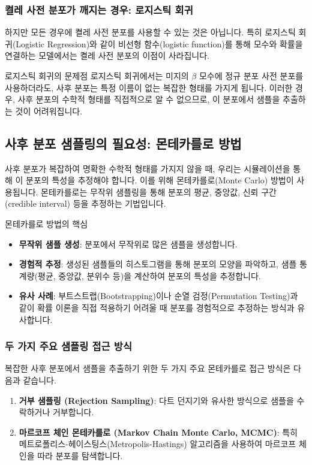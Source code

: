 \documentclass[11pt,a4paper]{article}
\begin{document}
\subsubsection*{켤레 사전 분포가 깨지는 경우: 로지스틱 회귀}
하지만 모든 경우에 켤레 사전 분포를 사용할 수 있는 것은 아닙니다. 특히 로지스틱 회귀(Logistic Regression)와 같이 비선형 함수(logistic function)를 통해 모수와 확률을 연결하는 모델에서는 켤레 사전 분포의 이점이 사라집니다.

\begin{warningbox}{로지스틱 회귀의 문제점}
로지스틱 회귀에서는 미지의 $\beta$ 모수에 정규 분포 사전 분포를 사용하더라도, 사후 분포는 특정 이름이 없는 복잡한 형태를 가지게 됩니다.
이러한 경우, 사후 분포의 수학적 형태를 직접적으로 알 수 없으므로, 이 분포에서 샘플을 추출하는 것이 어려워집니다.
\end{warningbox}

\subsection*{사후 분포 샘플링의 필요성: 몬테카를로 방법}
사후 분포가 복잡하여 명확한 수학적 형태를 가지지 않을 때, 우리는 시뮬레이션을 통해 이 분포의 특성을 추정해야 합니다. 이를 위해 몬테카를로(Monte Carlo) 방법이 사용됩니다. 몬테카를로는 무작위 샘플링을 통해 분포의 평균, 중앙값, 신뢰 구간(credible interval) 등을 추정하는 기법입니다.

\begin{mybox}{몬테카를로 방법의 핵심}
\begin{itemize}
    \item \textbf{무작위 샘플 생성}: 분포에서 무작위로 많은 샘플을 생성합니다.
    \item \textbf{경험적 추정}: 생성된 샘플들의 히스토그램을 통해 분포의 모양을 파악하고, 샘플 통계량(평균, 중앙값, 분위수 등)을 계산하여 분포의 특성을 추정합니다.
    \item \textbf{유사 사례}: 부트스트랩(Bootstrapping)이나 순열 검정(Permutation Testing)과 같이 확률 이론을 직접 적용하기 어려울 때 분포를 경험적으로 추정하는 방식과 유사합니다.
\end{itemize}
\end{mybox}

\subsubsection*{두 가지 주요 샘플링 접근 방식}
복잡한 사후 분포에서 샘플을 추출하기 위한 두 가지 주요 몬테카를로 접근 방식은 다음과 같습니다.
\begin{enumerate}
    \item \textbf{거부 샘플링 (Rejection Sampling)}: 다트 던지기와 유사한 방식으로 샘플을 수락하거나 거부합니다.
    \item \textbf{마르코프 체인 몬테카를로 (Markov Chain Monte Carlo, MCMC)}: 특히 메트로폴리스-헤이스팅스(Metropolis-Hastings) 알고리즘을 사용하여 마르코프 체인을 따라 분포를 탐색합니다.
\end{enumerate}
\end{document}
